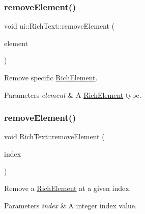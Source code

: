 \subsubsection{\texorpdfstring{remove\+Element()}{removeElement()}\hspace{0.1cm}{\footnotesize\ttfamily [2/4]}}
{\footnotesize\ttfamily void ui\+::\+Rich\+Text\+::remove\+Element (\begin{DoxyParamCaption}\item[{\hyperlink{classui_1_1RichElement}{Rich\+Element} $\ast$}]{element }\end{DoxyParamCaption})}



Remove specific \hyperlink{classui_1_1RichElement}{Rich\+Element}. 


\begin{DoxyParams}{Parameters}
{\em element} & A \hyperlink{classui_1_1RichElement}{Rich\+Element} type. \\
\hline
\end{DoxyParams}
\mbox{\label{classui_1_1RichText_a5943a34f2a067b8f40e21ee0678732a4}} 
\subsubsection{\texorpdfstring{remove\+Element()}{removeElement()}\hspace{0.1cm}{\footnotesize\ttfamily [3/4]}}
{\footnotesize\ttfamily void Rich\+Text\+::remove\+Element (\begin{DoxyParamCaption}\item[{int}]{index }\end{DoxyParamCaption})}



Remove a \hyperlink{classui_1_1RichElement}{Rich\+Element} at a given index. 


\begin{DoxyParams}{Parameters}
{\em index} & A integer index value. \\
\hline
\end{DoxyParams}
\mbox{\label{classui_1_1RichText_ae17d3860bef08a3a61992e228bd6c483}} 
